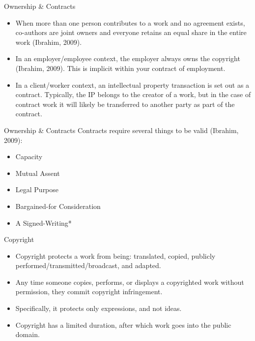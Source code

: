 \begin{frame}{Ownership \& Contracts}
	\begin{itemize}
		\item When more than one person contributes to a work and no agreement exists, co-authors are joint owners
		and everyone retains an equal share in the entire work (Ibrahim, 2009).
		\item In an employer/employee context, the employer always owns the copyright (Ibrahim, 2009). This is implicit
		within your contract of employment.
		\item In a client/worker context, an intellectual property transaction is set out as a contract. Typically, the IP belongs
		to the creator of a work, but in the case of contract work it will likely be transferred to another party as part of the contract.
	\end{itemize}
\end{frame}

\begin{frame}{Ownership \& Contracts}
Contracts require several things to be valid (Ibrahim, 2009):

	\begin{itemize}
		\item Capacity
		\item Mutual Assent
		\item Legal Purpose
		\item Bargained-for Consideration
		\item A Signed-Writing*
	\end{itemize}
\end{frame}

\begin{frame}{Copyright}
	\begin{itemize}
		\item Copyright protects a work from being: translated, copied, publicly performed/transmitted/broadcast, and adapted.
		\item Any time someone copies, performs, or displays a copyrighted work without
		permission, they commit copyright infringement.
		\item Specifically, it protects only expressions, and not ideas.
		\item Copyright has a limited duration, after which work goes into the public domain.
	\end{itemize}
\end{frame}

